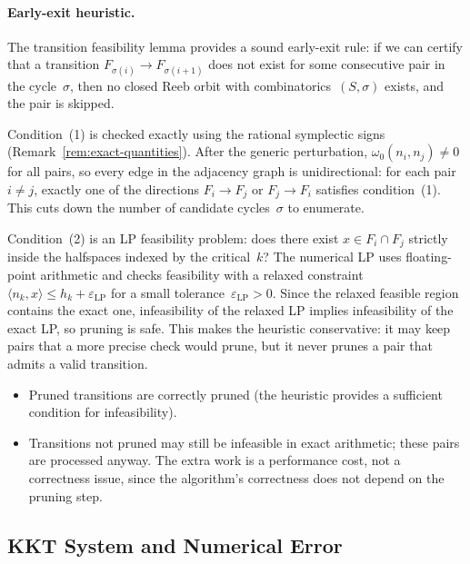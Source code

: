 \paragraph{Early-exit heuristic.}
The transition feasibility lemma provides a sound
early-exit rule: if we can certify that a transition
$F_{\sigma(i)} \to F_{\sigma(i+1)}$ does not exist for
some consecutive pair in the cycle~$\sigma$, then no
closed Reeb orbit with combinatorics~$(S, \sigma)$ exists,
and the pair is skipped.

Condition~(1) is checked exactly using the rational
symplectic signs (Remark~\ref{rem:exact-quantities}).
After the generic perturbation, $\omega_0(n_i, n_j) \neq 0$
for all pairs, so every edge in the adjacency graph is
unidirectional: for each pair $i \neq j$, exactly one of
the directions $F_i \to F_j$ or $F_j \to F_i$ satisfies
condition~(1).
This cuts down the number of candidate
cycles~$\sigma$ to enumerate.

Condition~(2) is an LP feasibility problem:
does there exist $x \in F_i \cap F_j$ strictly inside
the halfspaces indexed by the critical~$k$?
The numerical LP uses floating-point arithmetic and
checks feasibility with a relaxed constraint
$\langle n_k, x \rangle \leq h_k + \varepsilon_{\mathrm{LP}}$
for a small tolerance~$\varepsilon_{\mathrm{LP}} > 0$.
Since the relaxed feasible region contains the exact one,
infeasibility of the relaxed LP implies infeasibility
of the exact LP, so pruning is safe.
This makes the heuristic conservative:
it may keep pairs that a more precise check would prune,
but it never prunes a pair that admits a valid transition.
\begin{itemize}
\item Pruned transitions are correctly pruned
  (the heuristic provides a sufficient condition for infeasibility).
\item Transitions not pruned may still be infeasible in
  exact arithmetic; these pairs are processed anyway.
  The extra work is a performance cost, not a
  correctness issue, since the algorithm's correctness
  does not depend on the pruning step.
\end{itemize}


\subsection{KKT System and Numerical Error}\label{app:kkt}

